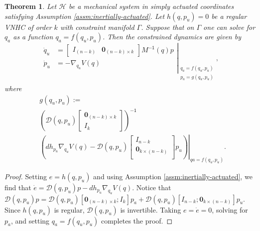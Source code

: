 \documentclass[journal,twoside,web]{ieeecolor}
\newtheorem{thm}{Theorem}%
\newcommand*{\inv}{^\mathsf{-1}}
\newcommand*{\Minv}{M^\mathsf{-1}}
\newcommand*{\Id}[1]{I_{#1}}
\newcommand*{\Zmat}[1]{\bm{0}_{#1}}
\newcommand*{\simpleB}{\begin{bmatrix}\Zmat{(n-k)\times k}\\ \Id{k}\end{bmatrix}}
\begin{document}
\begin{thm}\label{thm:zero-dynamics}
    Let \(\mathcal{H}\) be a mechanical system in simply actuated
    coordinates satisfying Assumption \ref{assm:inertially-actuated}. 
    Let \(h(q,p_u) = 0\) be a regular VNHC of order \(k\) with constraint
    manifold \(\Gamma\). Suppose that on \(\Gamma\) one can solve for
    \(q_a\) as a function \(q_a = f(q_u,p_u)\).
    Then the constrained dynamics are given by
    \begin{equation}\label{eqn:qpu-dynamics}
        \left.\begin{aligned}
                \dot{q}_u &= \begin{bmatrix}
                    \Id{(n-k)} & \Zmat{(n-k) \times k}
                \end{bmatrix}\Minv(q)p \\
            \dot{p}_u &= -\nabla_{q_u}V(q) \\
            \end{aligned}{}\right|_{\begin{array}{c}
                q_a = f(q_u,p_u) \\ 
                p_a = g(q_u,p_u) \\
            \end{array}}
            ,
    \end{equation}
    where
    \begin{equation}\label{eqn:g-qpu}
    \begin{aligned}
        &g(q_u,p_u) := \\
        &\left(\mathcal{D}(q,p_u) \simpleB \right)\inv 
               \\
        &\left.\left(dh_{p_u} \nabla_{q_u}V(q) - \mathcal{D}(q,p_u)
        \begin{bmatrix}
            I_{n-k} \\
            \Zmat{k \times (n-k)} \\
    \end{bmatrix} p_u\right)\right|_{qa = f(q_u,p_u)}
        .
    \end{aligned}
    \end{equation}
\end{thm}
\begin{proof}
    Setting \(e = h(q,p_u)\) and using Assumption
    \ref{assm:inertially-actuated}, we find that
    \(\dot{e} = \mathcal{D}(q,p_u)p - dh_{p_u}\nabla_{q_u}V(q)\).
    Notice that
    \(\mathcal{D}(q,p_u)p = \mathcal{D}(q,p_u)[\Zmat{(n-k)\times k}; \Id{k}]p_a
    + \mathcal{D}(q,p_u)[\Id{n-k};\Zmat{k \times (n-k)}] p_u\).
    Since \(h(q,p_u)\) is regular, \(\mathcal{D}(q,p_u)\) is invertible.
    Taking \(e = \dot{e} = 0\), solving for \(p_a\), and setting 
    \(q_a = f(q_u,p_u)\) completes the proof.
\end{proof}
\end{document}
